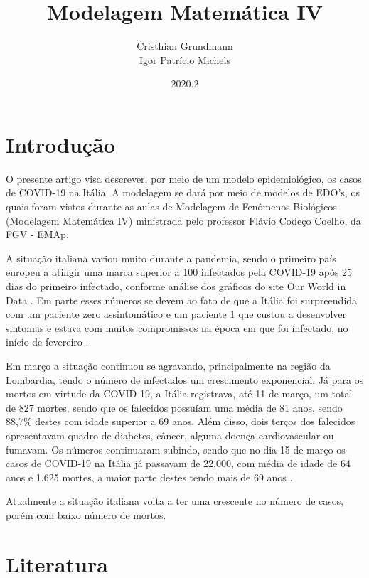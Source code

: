 \documentclass{article}
\title{Modelagem Matemática IV}
\author{Cristhian Grundmann \\
Igor Patrício Michels}
\date{2020.2}
\begin{document}
\maketitle

\section{Introdução}

O presente artigo visa descrever, por meio de um modelo epidemiológico, os casos de COVID-19 na Itália. A modelagem se dará por meio de modelos de EDO's, os quais foram vistos durante as aulas de Modelagem de Fenômenos Biológicos (Modelagem Matemática IV) ministrada pelo professor Flávio Codeço Coelho, da FGV - EMAp.

A situação italiana variou muito durante a pandemia, sendo o primeiro país europeu a atingir uma marca superior a 100 infectados pela COVID-19 após 25 dias do primeiro infectado, conforme análise dos gráficos do site Our World in Data \cite{owid}. Em parte esses números se devem ao fato de que a Itália foi surpreendida com um paciente zero assintomático e um paciente 1 que custou a desenvolver sintomas e estava com muitos compromissos na época em que foi infectado, no início de fevereiro \cite{dn}\cite{cm}.

Em março a situação continuou se agravando, principalmente na região da Lombardia, tendo o número de infectados um crescimento exponencial. Já para os mortos em virtude da COVID-19, a Itália registrava, até 11 de março, um total de 827 mortes, sendo que os falecidos possuíam uma média de 81 anos, sendo 88,7\% destes com idade superior a 69 anos. Além disso, dois terços dos falecidos apresentavam quadro de diabetes, câncer, alguma doença cardiovascular ou fumavam. Os números continuaram subindo, sendo que no dia 15 de março os casos de COVID-19 na Itália já passavam de 22.000, com média de idade de 64 anos e 1.625 mortes, a maior parte destes tendo mais de 69 anos \cite{REMUZZI20201225}\cite{10.1001/jama.2020.4344}.

Atualmente a situação italiana volta a ter uma crescente no número de casos, porém com baixo número de mortos.

\section{Literatura}
\end{document}
